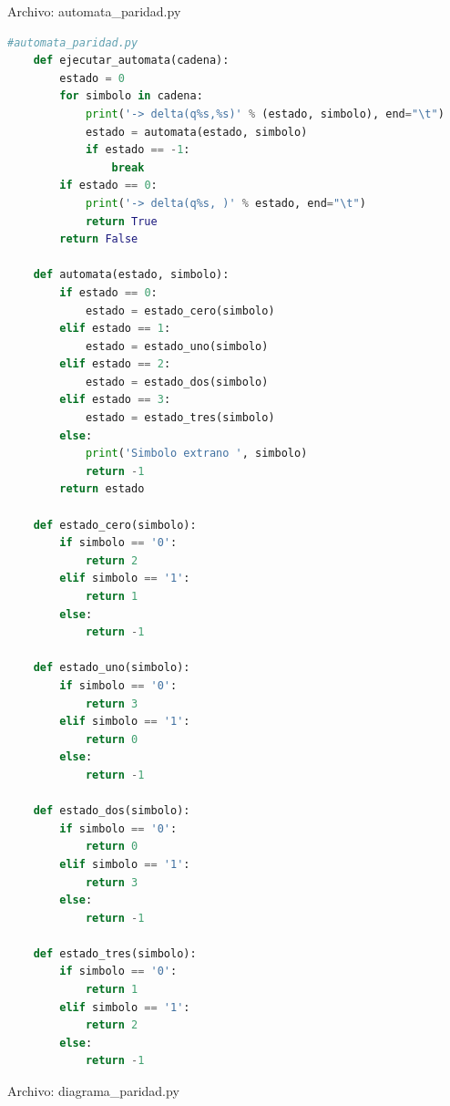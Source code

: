 	Archivo: automata\_paridad.py
	\begin{lstlisting}[language=Python]
	#automata_paridad.py
	def ejecutar_automata(cadena):
		estado = 0
		for simbolo in cadena:
			print('-> delta(q%s,%s)' % (estado, simbolo), end="\t")
			estado = automata(estado, simbolo)
			if estado == -1:
				break
		if estado == 0:
			print('-> delta(q%s, )' % estado, end="\t")
			return True
		return False
	
	def automata(estado, simbolo):
		if estado == 0:
			estado = estado_cero(simbolo)
		elif estado == 1:
			estado = estado_uno(simbolo)
		elif estado == 2:
			estado = estado_dos(simbolo)
		elif estado == 3:
			estado = estado_tres(simbolo)
		else:
			print('Simbolo extrano ', simbolo)
			return -1
		return estado
	
	def estado_cero(simbolo):
		if simbolo == '0':
			return 2
		elif simbolo == '1':
			return 1
		else:
			return -1
	
	def estado_uno(simbolo):
		if simbolo == '0':
			return 3
		elif simbolo == '1':
			return 0
		else:
			return -1
		
	def estado_dos(simbolo):
		if simbolo == '0':
			return 0
		elif simbolo == '1':
			return 3
		else:
			return -1
	
	def estado_tres(simbolo):
		if simbolo == '0':
			return 1
		elif simbolo == '1':
			return 2
		else:
			return -1
	\end{lstlisting}
	Archivo: diagrama\_paridad.py
